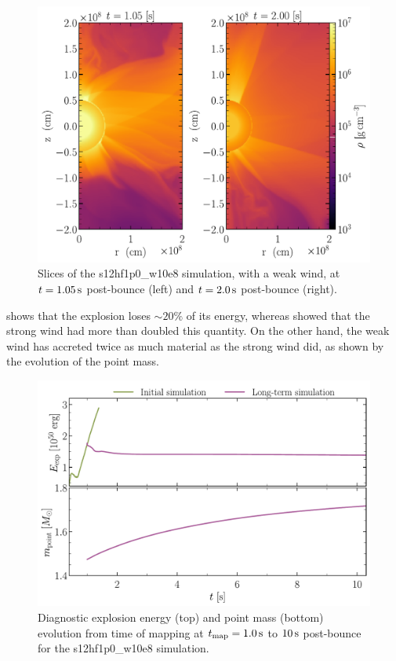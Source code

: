 \begin{figure}[ht!]
    \centering
    \includegraphics[width=1.0\linewidth]{figures/s12hf1p0_weak_slice.pdf}
    \caption{Slices of the s12hf1p0\_w10e8 simulation, with a weak wind, at \(t=1.05\,\mathrm{s}\) post-bounce (left) and \(t=2.0\,\mathrm{s}\) post-bounce (right).}
    \label{fig:s12hf1p0_weak_slice}
\end{figure}

\clearpage

 shows that the explosion loses \(\sim20\%\) of its energy, whereas  showed that the strong wind had more than doubled this quantity. On the other hand, the weak wind has accreted twice as much material as the strong wind did, as shown by the evolution of the point mass.

\begin{figure}[ht!]
    \centering
    \includegraphics[width=0.9\linewidth]{figures/s12hf1p0_weak_quantities.pdf}
    \caption{Diagnostic explosion energy (top) and point mass (bottom) evolution from time of mapping at \(t_\mathrm{map} = 1.0 \,\mathrm{s}\) to \(10\,\mathrm{s}\) post-bounce for the s12hf1p0\_w10e8 simulation.}
    \label{fig:s12hf1p0_weak_quantities}
\end{figure}

